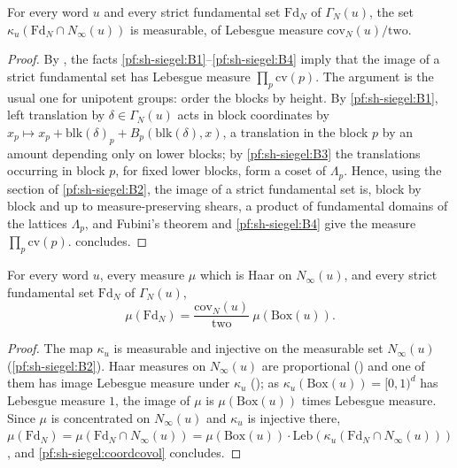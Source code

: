 \begin{proposition}\label{pf:sh-siegel:coordcovol}
For every word $u$ and every strict fundamental set $\mathrm{Fd}_N$ of $\Gamma_N(u)$, the set $\kappa_u(\mathrm{Fd}_N\cap
N_\infty(u))$ is measurable, of Lebesgue measure $\mathrm{cov}_N(u)/\mathrm{two}$.
\end{proposition}

\begin{proof}
By , the facts \ref{pf:sh-siegel:B1}--\ref{pf:sh-siegel:B4} imply that
the image of a strict fundamental set has Lebesgue measure $\prod_p\mathrm{cv}(p)$. The argument is the usual one for
unipotent groups: order the blocks by height. By \ref{pf:sh-siegel:B1}, left translation by $\delta\in\Gamma_N(u)$ acts in block
coordinates by $x_p\mapsto x_p+\mathrm{blk}(\delta)_p+B_p(\mathrm{blk}(\delta),x)$, a translation in the block $p$ by an amount
depending only on lower blocks; by \ref{pf:sh-siegel:B3} the translations occurring in block $p$, for fixed lower blocks, form a
coset of $\Lambda_p$. Hence, using the section of \ref{pf:sh-siegel:B2}, the image of a strict fundamental set is, block by
block and up to measure-preserving shears, a product of fundamental domains of the lattices $\Lambda_p$, and Fubini's theorem and
\ref{pf:sh-siegel:B4} give the measure $\prod_p\mathrm{cv}(p)$.  concludes.
\end{proof}

\begin{proposition}\label{pf:sh-siegel:covolN}
For every word $u$, every measure $\mu$ which is Haar on $N_\infty(u)$, and every strict fundamental set $\mathrm{Fd}_N$ of
$\Gamma_N(u)$,
\[
\mu(\mathrm{Fd}_N)=\frac{\mathrm{cov}_N(u)}{\mathrm{two}}\ \mu(\mathrm{Box}(u)).
\]
\end{proposition}

\begin{proof}
The map $\kappa_u$ is measurable and injective on the measurable set $N_\infty(u)$ (\ref{pf:sh-siegel:B2}). Haar measures on
$N_\infty(u)$ are proportional () and one of them has image Lebesgue
measure under $\kappa_u$ (); as $\kappa_u(\mathrm{Box}(u))=[0,1)^d$ has
Lebesgue measure $1$, the image of $\mu$ is $\mu(\mathrm{Box}(u))$ times Lebesgue measure. Since $\mu$ is concentrated on
$N_\infty(u)$ and $\kappa_u$ is injective there,
$\mu(\mathrm{Fd}_N)=\mu(\mathrm{Fd}_N\cap N_\infty(u))=\mu(\mathrm{Box}(u))\cdot\mathrm{Leb}(\kappa_u(\mathrm{Fd}_N\cap
N_\infty(u)))$, and \cref{pf:sh-siegel:coordcovol} concludes.
\end{proof}

